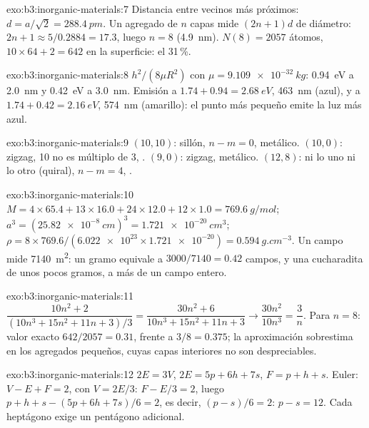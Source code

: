 \begin{solution}{exo:b3:inorganic-materials:7}
Distancia entre vecinos más próximos: $d = a/\sqrt2 = \qty{288.4}{pm}$. Un agregado de $n$ capas mide $(2n + 1)d$ de diámetro:
$2n + 1 \approx 5/0.2884 = 17.3$, luego $n = 8$ (\qty{4.9}{nm}). $N(8) = 2057$ átomos, $10 \times 64 + 2 = 642$ en la superficie:
el 31\,\%.
\end{solution}

\begin{solution}{exo:b3:inorganic-materials:8}
$h^2/(8\mu R^2)$ con $\mu = \qty{9.109e-32}{kg}$: \qty{0.94}{eV} a \qty{2.0}{nm} y \qty{0.42}{eV} a \qty{3.0}{nm}. Emisión a
$1.74 + 0.94 = \qty{2.68}{eV}$, \qty{463}{nm} (azul), y a $1.74 + 0.42 = \qty{2.16}{eV}$, \qty{574}{nm} (amarillo): el punto más pequeño
emite la luz más azul.
\end{solution}

\begin{solution}{exo:b3:inorganic-materials:9}
$(10, 10)$: sillón, $n - m = 0$, metálico. $(10, 0)$: zigzag, 10 no es múltiplo de 3, .
$(9, 0)$: zigzag, metálico. $(12, 8)$: ni lo uno ni lo otro (quiral), $n - m = 4$, .
\end{solution}

\begin{solution}{exo:b3:inorganic-materials:10}
$M = 4 \times 65.4 + 13 \times 16.0 + 24 \times 12.0 + 12 \times 1.0 = \qty{769.6}{g/mol}$; $a^3 = (\qty{25.82e-8}{cm})^3 = \qty{1.721e-20}{cm^3}$;
$\rho = 8 \times 769.6/(\num{6.022e23} \times \num{1.721e-20}) = \qty{0.594}{g.cm^{-3}}$. Un campo mide \qty{7140}{m^2}: un gramo equivale a
$3000/7140 = 0.42$ campos, y una cucharadita de unos pocos gramos, a más de un campo entero.
\end{solution}

\begin{solution}{exo:b3:inorganic-materials:11}
$\dfrac{10n^2 + 2}{(10n^3 + 15n^2 + 11n + 3)/3} = \dfrac{30n^2 + 6}{10n^3 + 15n^2 + 11n + 3} \to \dfrac{30n^2}{10n^3} = \dfrac3n$. Para $n = 8$: valor exacto
$642/2057 = 0.31$, frente a $3/8 = 0.375$; la aproximación sobrestima en los agregados pequeños,
cuyas capas interiores no son despreciables.
\end{solution}

\begin{solution}{exo:b3:inorganic-materials:12}
$2E = 3V$, $2E = 5p + 6h + 7s$, $F = p + h + s$. Euler: $V - E + F = 2$, con $V = 2E/3$: $F - E/3 = 2$, luego
$p + h + s - (5p + 6h + 7s)/6 = 2$, es decir, $(p - s)/6 = 2$: $p - s = 12$. Cada heptágono exige un
pentágono adicional.
\end{solution}

